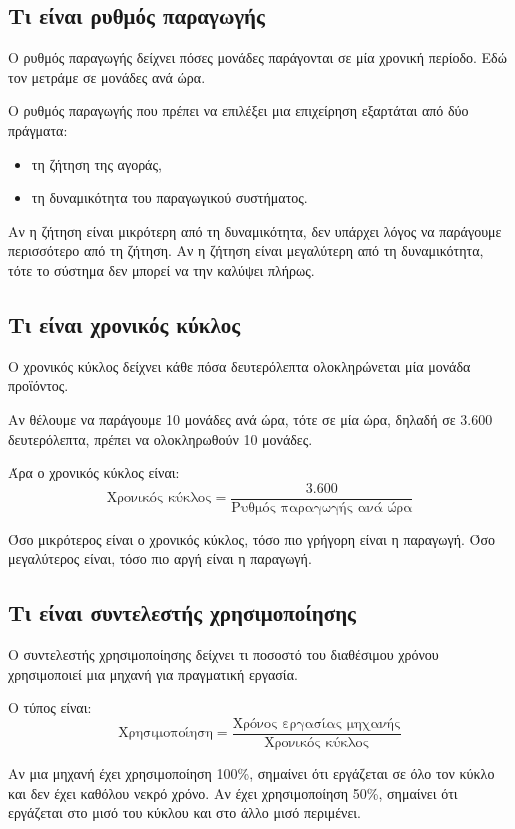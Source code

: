 \documentclass[12pt,a4paper]{article}
\begin{document}
\subsection{Τι είναι ρυθμός παραγωγής}

Ο ρυθμός παραγωγής δείχνει πόσες μονάδες παράγονται σε μία χρονική περίοδο. Εδώ τον μετράμε σε μονάδες ανά ώρα.

Ο ρυθμός παραγωγής που πρέπει να επιλέξει μια επιχείρηση εξαρτάται από δύο πράγματα:

\begin{itemize}
    \item τη ζήτηση της αγοράς,
    \item τη δυναμικότητα του παραγωγικού συστήματος.
\end{itemize}

Αν η ζήτηση είναι μικρότερη από τη δυναμικότητα, δεν υπάρχει λόγος να παράγουμε περισσότερο από τη ζήτηση. Αν η ζήτηση είναι μεγαλύτερη από τη δυναμικότητα, τότε το σύστημα δεν μπορεί να την καλύψει πλήρως.

\subsection{Τι είναι χρονικός κύκλος}

Ο χρονικός κύκλος δείχνει κάθε πόσα δευτερόλεπτα ολοκληρώνεται μία μονάδα προϊόντος.

Αν θέλουμε να παράγουμε 10 μονάδες ανά ώρα, τότε σε μία ώρα, δηλαδή σε 3.600 δευτερόλεπτα, πρέπει να ολοκληρωθούν 10 μονάδες.

Άρα ο χρονικός κύκλος είναι:
\[
\text{Χρονικός κύκλος}=
\frac{3.600}{\text{Ρυθμός παραγωγής ανά ώρα}}
\]

Όσο μικρότερος είναι ο χρονικός κύκλος, τόσο πιο γρήγορη είναι η παραγωγή. Όσο μεγαλύτερος είναι, τόσο πιο αργή είναι η παραγωγή.

\subsection{Τι είναι συντελεστής χρησιμοποίησης}

Ο συντελεστής χρησιμοποίησης δείχνει τι ποσοστό του διαθέσιμου χρόνου χρησιμοποιεί μια μηχανή για πραγματική εργασία.

Ο τύπος είναι:
\[
\text{Χρησιμοποίηση}=
\frac{\text{Χρόνος εργασίας μηχανής}}{\text{Χρονικός κύκλος}}
\]

Αν μια μηχανή έχει χρησιμοποίηση 100\%, σημαίνει ότι εργάζεται σε όλο τον κύκλο και δεν έχει καθόλου νεκρό χρόνο. Αν έχει χρησιμοποίηση 50\%, σημαίνει ότι εργάζεται στο μισό του κύκλου και στο άλλο μισό περιμένει.
\end{document}
